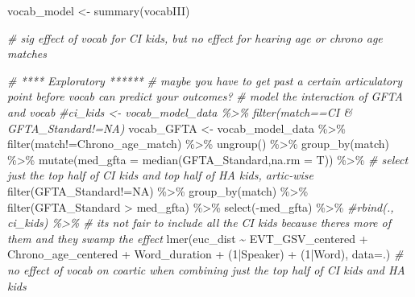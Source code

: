 \documentclass[
]{article}
\newenvironment{Shaded}{\begin{snugshade}}{\end{snugshade}}
\newcommand{\AttributeTok}[1]{\textcolor[rgb]{0.77,0.63,0.00}{#1}}
\newcommand{\CommentTok}[1]{\textcolor[rgb]{0.56,0.35,0.01}{\textit{#1}}}
\newcommand{\DecValTok}[1]{\textcolor[rgb]{0.00,0.00,0.81}{#1}}
\newcommand{\FunctionTok}[1]{\textcolor[rgb]{0.00,0.00,0.00}{#1}}
\newcommand{\NormalTok}[1]{#1}
\newcommand{\OtherTok}[1]{\textcolor[rgb]{0.56,0.35,0.01}{#1}}
\newcommand{\SpecialCharTok}[1]{\textcolor[rgb]{0.00,0.00,0.00}{#1}}
\newcommand{\StringTok}[1]{\textcolor[rgb]{0.31,0.60,0.02}{#1}}
\begin{document}
\begin{Shaded}
\begin{Highlighting}[]
\NormalTok{vocab\_model }\OtherTok{\textless{}{-}} \FunctionTok{summary}\NormalTok{(vocabIII)}

\CommentTok{\# sig effect of vocab for CI kids, but no effect for hearing age or chrono age matches}

\CommentTok{\# **** Exploratory ******}
\CommentTok{\# maybe you have to get past a certain articulatory point before vocab can predict your outcomes?}
\CommentTok{\# model the interaction of GFTA and vocab}
\CommentTok{\#ci\_kids \textless{}{-} vocab\_model\_data \%\textgreater{}\% filter(match==\textquotesingle{}CI\textquotesingle{} \& GFTA\_Standard!=\textquotesingle{}NA\textquotesingle{})}
\NormalTok{vocab\_GFTA }\OtherTok{\textless{}{-}}\NormalTok{ vocab\_model\_data }\SpecialCharTok{\%\textgreater{}\%}
  \FunctionTok{filter}\NormalTok{(match}\SpecialCharTok{!=}\StringTok{\textquotesingle{}Chrono\_age\_match\textquotesingle{}}\NormalTok{) }\SpecialCharTok{\%\textgreater{}\%}
  \FunctionTok{ungroup}\NormalTok{() }\SpecialCharTok{\%\textgreater{}\%}
  \FunctionTok{group\_by}\NormalTok{(match) }\SpecialCharTok{\%\textgreater{}\%}
  \FunctionTok{mutate}\NormalTok{(}\AttributeTok{med\_gfta =} \FunctionTok{median}\NormalTok{(GFTA\_Standard,}\AttributeTok{na.rm =}\NormalTok{ T)) }\SpecialCharTok{\%\textgreater{}\%} \CommentTok{\# select just the top half of CI kids and top half of HA kids, artic{-}wise}
  \FunctionTok{filter}\NormalTok{(GFTA\_Standard}\SpecialCharTok{!=}\StringTok{\textquotesingle{}NA\textquotesingle{}}\NormalTok{) }\SpecialCharTok{\%\textgreater{}\%}
  \FunctionTok{group\_by}\NormalTok{(match) }\SpecialCharTok{\%\textgreater{}\%}
  \FunctionTok{filter}\NormalTok{(GFTA\_Standard }\SpecialCharTok{\textgreater{}}\NormalTok{ med\_gfta) }\SpecialCharTok{\%\textgreater{}\%}
  \FunctionTok{select}\NormalTok{(}\SpecialCharTok{{-}}\NormalTok{med\_gfta) }\SpecialCharTok{\%\textgreater{}\%}
  \CommentTok{\#rbind(., ci\_kids) \%\textgreater{}\% \# it\textquotesingle{}s not fair to include all the CI kids because there\textquotesingle{}s more of them and they swamp the effect}
  \FunctionTok{lmer}\NormalTok{(euc\_dist }\SpecialCharTok{\textasciitilde{}}\NormalTok{ EVT\_GSV\_centered }\SpecialCharTok{+}
\NormalTok{       Chrono\_age\_centered }\SpecialCharTok{+} 
\NormalTok{         Word\_duration }\SpecialCharTok{+} 
\NormalTok{         (}\DecValTok{1}\SpecialCharTok{|}\NormalTok{Speaker) }\SpecialCharTok{+} 
\NormalTok{         (}\DecValTok{1}\SpecialCharTok{|}\NormalTok{Word), }
       \AttributeTok{data=}\NormalTok{.) }\CommentTok{\# no effect of vocab on coartic when combining just the top half of CI kids and HA kids }


\end{Highlighting}
\end{Shaded}
\end{document}
